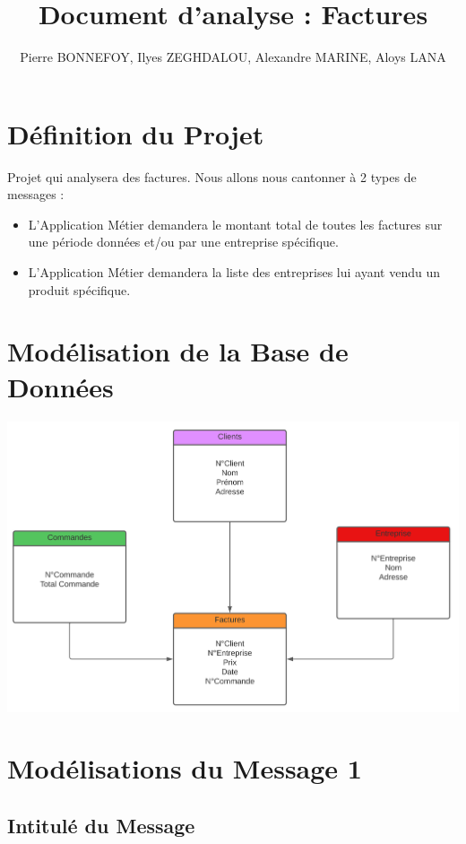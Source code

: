 \documentclass[a4paper, 11pt]{article}
\title{Document d'analyse : Factures}
\author{Pierre BONNEFOY, Ilyes ZEGHDALOU, Alexandre MARINE, Aloys LANA}
\begin{document}
\maketitle

\tableofcontents

\newpage
\section{Définition du Projet}
Projet qui analysera des factures. Nous allons nous cantonner à 2 types de messages :
\begin{itemize}
    \item L'Application Métier demandera le montant total de toutes les factures sur une période données et/ou par une entreprise spécifique.
    \item L'Application Métier demandera la liste des entreprises lui ayant vendu un produit spécifique.
\end{itemize}

\section{Modélisation de la Base de Données}
    \begin{center}
    \includegraphics[scale=0.3]{schema_bdd.png}
    \end{center}

\section{Modélisations du Message 1}
    \subsection{Intitulé du Message}
\end{document}
